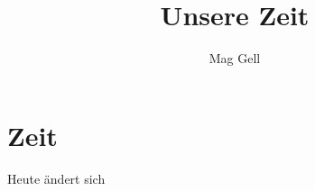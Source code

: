 \documentclass[13pt, a4paper]{report}
\title{Unsere Zeit}
\author{Mag Gell}
\begin{document}
	
\titlepage

\part{Zeit}
Heute ändert sich
\end{document}
